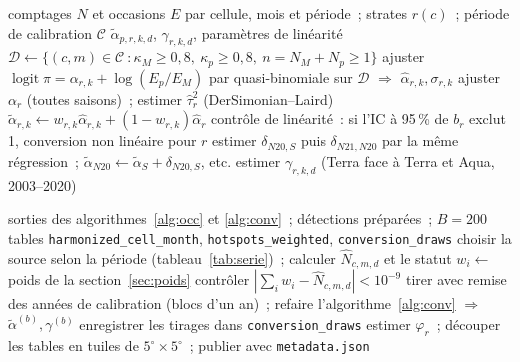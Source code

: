 \documentclass[11pt,a4paper]{article}
\DeclareMathOperator{\logit}{logit}
\begin{document}
\begin{algorithm}[h]
\caption{Estimation de la conversion VIIRS $\to$ MODIS}
\label{alg:conv}
\begin{algorithmic}[1]
\Require comptages $N$ et occasions $E$ par cellule, mois et période~; strates $r(c)$~; période de calibration $\mathcal{C}$
\Ensure $\tilde\alpha_{p,r,k,d}$, $\gamma_{r,k,d}$, paramètres de linéarité
  \State $\mathcal{D} \gets \{(c,m) \in \mathcal{C}~: \kappa_M \ge 0{,}8,\ \kappa_p \ge 0{,}8,\ n = N_M + N_p \ge 1\}$
  \State ajuster $\logit \pi = \alpha_{r,k} + \log(E_p/E_M)$ par quasi-binomiale sur $\mathcal{D}$ $\Rightarrow$ $\hat\alpha_{r,k}, \sigma_{r,k}$
  \State ajuster $\alpha_r$ (toutes saisons)~; estimer $\hat\tau_r^2$ (DerSimonian--Laird)
  \State $\tilde\alpha_{r,k} \gets w_{r,k}\hat\alpha_{r,k} + (1-w_{r,k})\hat\alpha_r$
  \State contrôle de linéarité~: si l'IC à 95\,\% de $b_r$ exclut 1, conversion non linéaire pour $r$
\EndFor
\State estimer $\delta_{N20,S}$ puis $\delta_{N21,N20}$ par la même régression~; $\tilde\alpha_{N20} \gets \tilde\alpha_S + \delta_{N20,S}$, etc.
\State estimer $\gamma_{r,k,d}$ (Terra face à Terra et Aqua, 2003--2020)
\end{algorithmic}
\end{algorithm}

\begin{algorithm}[h]
\caption{Série harmonisée, poids et tirages}
\label{alg:serie}
\begin{algorithmic}[1]
\Require sorties des algorithmes~\ref{alg:occ} et \ref{alg:conv}~; détections préparées~; $B=200$
\Ensure tables \texttt{harmonized\_cell\_month}, \texttt{hotspots\_weighted}, \texttt{conversion\_draws}
  \State choisir la source selon la période (tableau~\ref{tab:serie})~; calculer $\hat N_{c,m,d}$ et le statut
   \State $w_i \gets$ poids de la section~\ref{sec:poids} \EndFor
  \State contrôler $\left|\sum_i w_i - \hat N_{c,m,d}\right| < 10^{-9}$
\EndFor
{}
  \State tirer avec remise des années de calibration (blocs d'un an)~; refaire l'algorithme~\ref{alg:conv} $\Rightarrow$ $\tilde\alpha^{(b)}, \gamma^{(b)}$
  \State enregistrer les tirages dans \texttt{conversion\_draws}
\EndFor
\State estimer $\varphi_r$~; découper les tables en tuiles de $5^\circ\times5^\circ$~; publier avec \texttt{metadata.json}
\end{algorithmic}
\end{algorithm}
\end{document}
